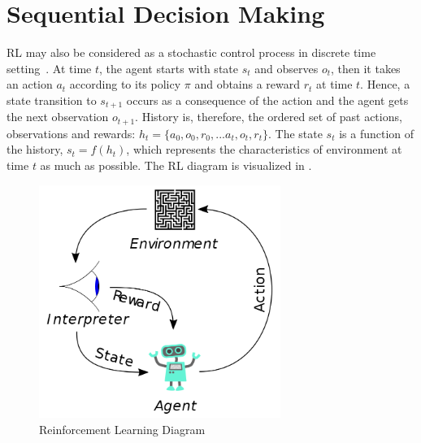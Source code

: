 \section{Sequential Decision Making}
\label{sec:decision_making}

RL may also be considered as a stochastic control process in discrete time setting~\cite{sutton_reinforcement_1998}. 
At time $t$, the agent starts with state $s_t$ and observes $o_t$, 
then it takes an action $a_t$ according to its policy $\pi$ and obtains a reward $r_t$ at time $t$. 
Hence, a state transition to $s_{t+1}$ occurs as a consequence of the action and the agent gets the next observation $o_{t+1}$. 
History is, therefore, the ordered set of past actions, observations and rewards: $h_t=\{ a_0, o_0, r_0, ... a_t, o_t, r_t\}$. 
The state $s_t$ is a function of the history, $s_t=f(h_t)$, 
which represents the characteristics of environment at time $t$ as much as possible. 
The RL diagram is visualized in . 
\begin{figure}
	\centering
	\includegraphics[width=0.7\textwidth]{figures/ml_theory/RL_diagram.png}
	\caption{Reinforcement Learning Diagram}
	\label{fig:rl_diagram}
\end{figure}